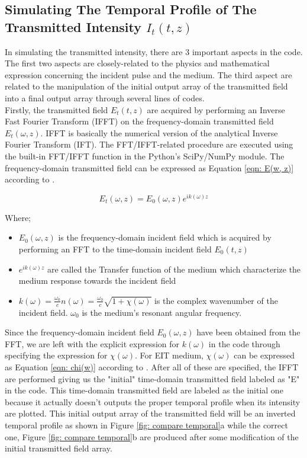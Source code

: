 \subsection{Simulating The Temporal Profile of The Transmitted Intensity $I_{t}(t, z)$}\label{temporalProfile}
In simulating the transmitted intensity, there are 3 important aspects in the code. The first two aspects are closely-related to the physics and mathematical expression concerning the incident pulse and the medium. The third aspect are related to the manipulation of the initial output array of the transmitted field into a final output array through several lines of codes.\\

Firstly, the transmitted field $E_{t}(t, z)$ are acquired by performing an Inverse Fast Fourier Transform (IFFT) on the frequency-domain transmitted field $E_{t}(\omega, z)$. IFFT is basically the numerical version of the analytical Inverse Fourier Transform (IFT). The FFT/IFFT-related procedure are executed using the built-in FFT/IFFT function in the Python's SciPy/NumPy module. The frequency-domain transmitted field can be expressed as Equation \ref{eqn: E(w, z)} according to \cite{jeong2006thesis}.

\begin{equation}
    E_{t}(\omega, z) = E_{0}(\omega, z) e^{i k(\omega) z}
    \label{eqn: E(w, z)}
\end{equation}

Where;

\begin{itemize}
    \item $E_{0}(\omega, z)$ is the frequency-domain incident field which is acquired by performing an FFT to the time-domain incident field $E_{0}(t, z)$
    \item $e^{i k(\omega) z}$ are called the Transfer function of the medium which characterize the medium response towards the incident field
    \item $k(\omega) = \frac{\omega_{0}}{c} n(\omega) = \frac{\omega_{0}}{c} \sqrt{1 + \chi(\omega)}$ is the complex wavenumber of the incident field. $\omega_{0}$ is the medium's resonant angular frequency.
\end{itemize}

Since the frequency-domain incident field $E_{0}(\omega, z)$ have been obtained from the FFT, we are left with the explicit expression for $k(\omega)$ in the code through specifying the expression for $\chi(\omega)$. For EIT medium, $\chi(\omega)$ can be expressed as Equation \ref{eqn: chi(w)} according to \cite{Jeong2009, Braje2004}. After all of these are specified, the IFFT are performed giving us the "initial" time-domain transmitted field labeled as "E" in the code. This time-domain transmitted field are labeled as the initial one because it actually doesn't outputs the proper temporal profile when its intensity are plotted. This initial output array of the transmitted field will be an inverted temporal profile as shown in Figure \ref{fig: compare temporal}a while the correct one, Figure \ref{fig: compare temporal}b are produced after some modification of the initial transmitted field array.\\


